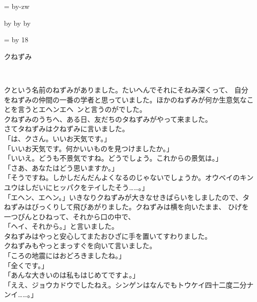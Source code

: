 \documentclass[
a4paper,
10pt,
book]
{tarticle}
\makeatletter
\def\mojiparline#1{
    \newcounter{mpl}
    \setcounter{mpl}{#1}
    \@tempdima=\linewidth
    \advance\@tempdima by-\value{mpl}zw
    \addtocounter{mpl}{-1}
    \divide\@tempdima by \value{mpl}
    \advance\kanjiskip by\@tempdima
    \advance\parindent by\@tempdima
    }
\def\linesparpage#1{
        \baselineskip=\textheight
        \divide\baselineskip by #1
        }
\makeatother
\begin{document}
\Large

\mojiparline{42}
\linesparpage{18}

{} %
\mcfamily %

\thispagestyle{empty}
{\fontsize{30pt}{24pt}\selectfont
クねずみ\\
\begin{flushright}
    \\
\end{flushright}
}
\newpage
\setcounter{page}{1}

\indent クという名前のねずみがありました。たいへんでそれにそねみ深くって、
自分をねずみの仲間の一番の学者と思っていました。ほかのねずみが何か生意気なことを言うとエヘンエヘ~ンと言うのがでした。\\
\indent クねずみのうちへ、ある日、友だちのタねずみがやって来ました。\\
\indent さてタねずみはクねずみに言いました。\\
「は、クさん。いいお天気です。」\\
「いいお天気です。何かいいものを見つけましたか。」\\
「いいえ。どうも不景気ですね。どうでしょう。これからの景気は。」\\
「さあ、あなたはどう思いますか。」\\
「そうですね。しかしだんだんよくなるのじゃないでしょうか。オウベイのキンユウはしだいにヒッパクをテイしたそう……。」\\
「エヘン、エヘン。」いきなりクねずみが大きなせきばらいをしましたので、タねずみはびっくりして飛びあがりました。クねずみは横を向いたまま、
ひげを一つぴんとひねって、それから口の中で、\\
「ヘイ、それから。」と言いました。\\
\indent タねずみはやっと安心してまたおひざに手を置いてすわりました。\\
\indent クねずみもやっとまっすぐを向いて言いました。\\
「ころの地震にはおどろきましたね。」\\
「全くです。」\\
「あんな大きいのは私もはじめてですよ。」\\
「ええ、ジョウカドウでしたねえ。シンゲンはなんでもトウケイ四十二度二分ナンイ……。」\\
\end{document}
